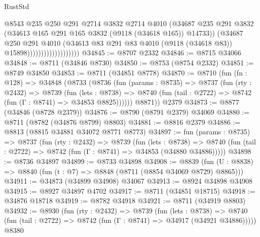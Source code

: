 \begin{lexlean}{RustStd}
\begin{coremodule}
                                      @8543
                                      @235
                                      @250
                                      @291
                                      @2714
                                      @3832
                                      @2714
                                      @4010
                                      (@34687
                                        @235
                                        @291
                                        @3832
                                        (@34613 @165 @291 @165 @3832 (@9118 (@34618 @165)) @14733))
                                      (@34687
                                        @250
                                        @291
                                        @4010
                                        (@34613
                                          @83
                                          @291
                                          @83
                                          @4010
                                          (@9118 (@34618 @83))
                                          @15898)))))))))))))))))))
@34845 := @8707 @2332
@34846 := @8715 @34066
@34848 := @8711 (@34846 @8730)
@34850 := @8753 (@8754 @2332)
@34851 := @8749 @34850
@34853 := @8711 (@34851 @8778)
@34870 := @8710
    (fun (fn : @128) =>
    @34848
      (@8733
        (@8736
          (fun (params : @8735) =>
          @8737
            (fun (rty : @2432) =>
            @8739
              (fun (lets : @8738) =>
              @8740 (fun (tail : @2722) => @8742 (fun (Γ : @8741) => @34853 @8825))))))
        @8871))
    @2379
@34873 := @8877 (@34846 (@8728 @2379))
@34876 := @8790 (@8791 @2379) @34069
@34880 := @8711 (@8782 (@34876 @8799) @8803)
@34881 := @8816 @2379
@34886 := @8813 (@8815 @34881 @34072 @8771 @8773)
@34897 := fun (params : @8735) =>
  @8737
    (fun (rty : @2432) =>
    @8739
      (fun (lets : @8738) =>
      @8740 (fun (tail : @2722) => @8742 (fun (Γ : @8741) => @34853 (@34880 @34886)))))
@34898 := @8736 @34897
@34899 := @8733 @34898
@34908 := @8839
    (fun (U : @8838) => @8840 (fun (t : @7) => @8848 (@8711 (@8854 @34069 @8729) @8865)))
@34911 := @34873 (@34899 @34908) @34067
@34913 := @8924 @34898 @34908
@34915 := @8927 @34897 @4702
@34917 := @8711 (@34851 @18715)
@34918 := @34876 @18718
@34919 := @8782 @34918
@34921 := @8711 (@34919 @8803)
@34932 := @8930
    (fun (rty : @2432) =>
    @8739
      (fun (lets : @8738) =>
      @8740 (fun (tail : @2722) => @8742 (fun (Γ : @8741) => @34917 (@34921 @34886)))))
    @8380

\end{coremodule}
\end{lexlean}

